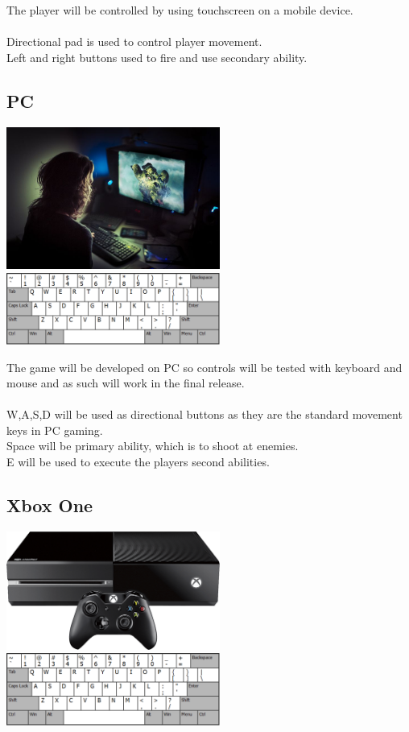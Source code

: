 \documentclass[a4paper]{scrreprt}
\begin{document}
The player will be controlled by using touchscreen on a mobile device. \\\\

Directional pad is used to control player movement.\\
Left and right buttons used to fire and use secondary ability.

\subsection{PC}

\begin{center}
\includegraphics[width=7cm]{pc-gaming}
\includegraphics[width=7cm]{pc-controls}
\end{center}

The game will be developed on PC so controls will be tested with keyboard and mouse and as such will work in the final release. \\\\

W,A,S,D will be used as directional buttons as they are the standard movement keys in PC gaming. \\
Space will be primary ability, which is to shoot at enemies. \\
E will be used to execute the players second abilities.

\subsection{Xbox One}

\begin{center}
\includegraphics[width=7cm]{Xbox-one}
\includegraphics[width=7cm]{pc-controls}
\end{center}
\end{document}
